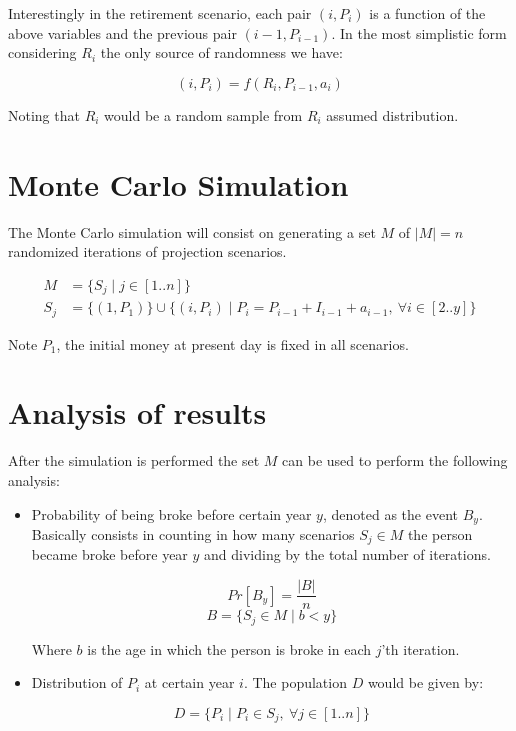 \documentclass[8pt]{article}
\begin{document}
Interestingly in the retirement scenario, each pair $(i,P_i)$ is a function of the above variables and the previous pair $(i-1,P_{i-1})$.  In the most simplistic form considering \textbf{$R_i$} the only source of randomness we have:

\[ (i,P_i) = f(R_i, P_{i-1}, a_i) \]

Noting that $R_i$ would be a random sample from $R_i$ assumed distribution.

\section{Monte Carlo Simulation}

The Monte Carlo simulation will consist on generating a set $M$ of $|M|=n$ randomized iterations of projection scenarios.  

\begin{align*}
M & = \{ S_j \mid j \in [1..n] \} \\
S_j & = \{(1,P_1)\} \cup \{(i,P_i) \mid  P_{i} = P_{i-1} + I_{i-1} + a_{i-1}, ~ \forall i \in [2..y] \}
\end{align*}

Note $P_1$, the initial money at present day is fixed in all scenarios.

\section{Analysis of results}


After the simulation is performed the set $M$ can be used to perform the following analysis:

\begin{itemize}
\item Probability of being broke before certain year $y$, denoted as the event $B_y$.  Basically consists in counting in how many scenarios $S_j\in M$ the person became broke before year $y$ and dividing by the total number of iterations.

\[ Pr[B_y] = \frac{|B|}{n} \]
\[B  = \{S_j \in M\mid b < y \} \]

Where $b$ is the age in which the person is broke in each $j$'th iteration.

\item Distribution of $P_i$ at certain year $i$.  The population $D$ would be given by:

\[D=\{P_i \mid P_i \in S_j, ~\forall j \in [1..n] \}\]

\end{itemize}
\end{document}
